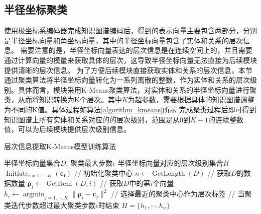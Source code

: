 \documentclass[algorithmlist, AutoFakeBold, AutoFakeSlant, figurelist, tablelist, nomlist, engineering]{seuthesix}
\begin{document}
\subsection{半径坐标聚类}
使用极坐标系编码器完成知识图谱编码后，得到的表示向量主要包含两部分，分别是半径坐标向量和角坐标向量，其中的半径坐标向量包含了实体和关系的层次信息。
需要注意的是，半径坐标向量表达的层次信息是在连续空间上的，并且需要通过计算向量的模量来获取具体的层次，这导致半径坐标向量无法直接为后续模块提供清晰的层次信息。
为了方便后续模块直接获取实体和关系的层次信息，本节通过聚类算法将半径坐标向量转化为一系列离散的整数，作为实体和关系的层次级别。具体而言，模块采用K-Means聚类算法，对实体和关系的半径坐标向量进行聚类，从而将知识转换为K个层次。其中$K$为超参数，需要根据具体的知识图谱调整为不同的K值。具体过程如算法\ref{algorithm_kmeans}所示
完成聚类过程后即可得到知识图谱上所有实体和关系对应的的层次级别，范围是从0到$K-1$的连续整数值，可以为后续模块提供层次级别信息。
\begin{algorithm}[tb]
	\caption{层次信息提取K-Means模型训练算法}  
	\label{algorithm_kmeans}
	\begin{algorithmic}[1]
  \Require 半径坐标向量集合$D$, 聚类最大步数$\epsilon$
  \Ensure 半径坐标向量对应的层次级别集合$H$
  \State $\operatorname{Initiate}_{i=1, \cdots, K}(\bm{c_i})$ // 初始化聚类中心
  \State $n \leftarrow \operatorname{GetLength}(D)$ // 获取$D$的数据数量
  \Repeat 
  \State $\bm{\rho}_i \leftarrow \operatorname{GetItem}(D, i)$ // 获取$D$中的第$i$个向量
  \State $h_i \leftarrow \operatorname{argmin}_{j=1, \cdots, K} \|\bm{\rho}_i - \bm{c}_j\|^2$ // 选择最近的聚类中心作为层次标签
  \EndFor
   // 当聚类迭代步数超过最大聚类步数$\epsilon$时结束
  \State \Return $H = \{h_1, \cdots, h_n\}$
	\end{algorithmic}
\end{algorithm} 
\end{document}
